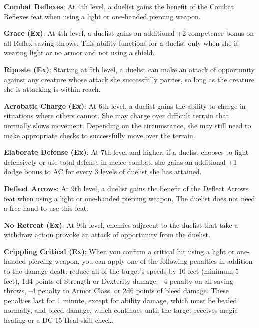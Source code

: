 \textbf{Combat Reflexes}: At 4th level, a duelist gains the benefit of the Combat Reflexes feat when using a light or one-handed piercing weapon.
				
\textbf{Grace (Ex)}: At 4th level, a duelist gains an additional +2 competence bonus on all Reflex saving throws. This ability functions for a duelist only when she is wearing light or no armor and not using a shield.
				
\textbf{Riposte (Ex)}: Starting at 5th level, a duelist can make an attack of opportunity against any creature whose attack she successfully parries, so long as the creature she is attacking is within reach.
				
\textbf{Acrobatic Charge (Ex)}: At 6th level, a duelist gains the ability to charge in situations where others cannot. She may charge over difficult terrain that normally slows movement. Depending on the circumstance, she may still need to make appropriate checks to successfully move over the terrain.
				
\textbf{Elaborate Defense (Ex)}: At 7th level and higher, if a duelist chooses to fight defensively or use total defense in melee combat, she gains an additional +1 dodge bonus to AC for every 3 levels of duelist she has attained.
				
\textbf{Deflect Arrows}: At 9th level, a duelist gains the benefit of the Deflect Arrows feat when using a light or one-handed piercing weapon. The duelist does not need a free hand to use this feat.
				
\textbf{No Retreat (Ex)}: At 9th level, enemies adjacent to the duelist that take a withdraw action provoke an attack of opportunity from the duelist.
				
\textbf{Crippling Critical (Ex)}: When you confirm a critical hit using a light or one-handed piercing weapon, you can apply one of the following penalties in addition to the damage dealt: reduce all of the target's speeds by 10 feet (minimum 5 feet), 1d4 points of Strength or Dexterity damage, --4 penalty on all saving throws, --4 penalty to Armor Class, or 2d6 points of bleed damage. These penalties last for 1 minute, except for ability damage, which must be healed normally, and bleed damage, which continues until the target receives magic healing or a DC 15 Heal skill check.
        	
